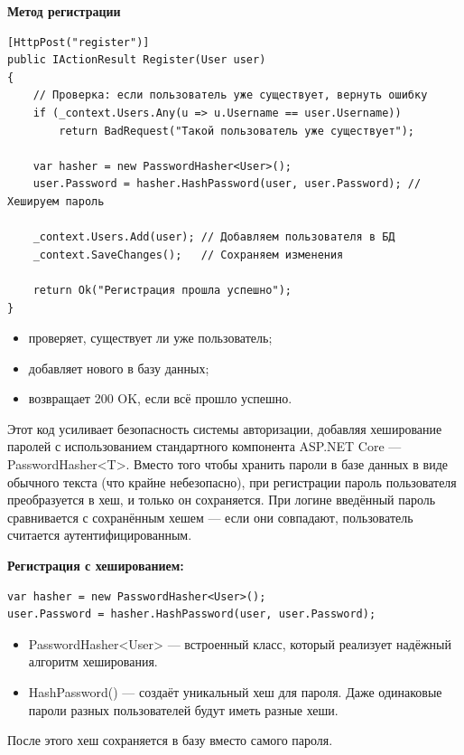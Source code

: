 \documentclass[12pt]{article}
\renewcommand{\texttt}[1]{{\small\ttfamily #1}}
\numberwithin{listing}{section}
\numberwithin{figure}{section}
\begin{document}
\noindent \textbf{Метод регистрации}
\begin{verbatim}
[HttpPost("register")]
public IActionResult Register(User user)
{
    // Проверка: если пользователь уже существует, вернуть ошибку
    if (_context.Users.Any(u => u.Username == user.Username))
        return BadRequest("Такой пользователь уже существует");

    var hasher = new PasswordHasher<User>();
    user.Password = hasher.HashPassword(user, user.Password); // Хешируем пароль

    _context.Users.Add(user); // Добавляем пользователя в БД
    _context.SaveChanges();   // Сохраняем изменения

    return Ok("Регистрация прошла успешно");
}
\end{verbatim}
\begin{itemize}
	\item проверяет, существует ли уже пользователь;
	\item добавляет нового в базу данных;
	\item возвращает 200 OK, если всё прошло успешно.
\end{itemize}
Этот код усиливает безопасность системы авторизации, добавляя хеширование паролей с использованием стандартного компонента ASP.NET Core — \texttt{PasswordHasher<T>}.
Вместо того чтобы хранить пароли в базе данных в виде обычного текста (что крайне небезопасно), при регистрации пароль пользователя преобразуется в хеш, и только он сохраняется. При логине введённый пароль сравнивается с сохранённым хешем — если они совпадают, пользователь считается аутентифицированным.

\noindent \textbf{Регистрация с хешированием:}
\begin{verbatim}
var hasher = new PasswordHasher<User>();
user.Password = hasher.HashPassword(user, user.Password);
\end{verbatim}
\begin{itemize}
	\item \texttt{PasswordHasher<User>} — встроенный класс, который реализует надёжный алгоритм хеширования.
	\item \texttt{HashPassword()} — создаёт уникальный хеш для пароля. Даже одинаковые пароли разных пользователей будут иметь разные хеши.
\end{itemize}
После этого хеш сохраняется в базу вместо самого пароля.
\end{document}
